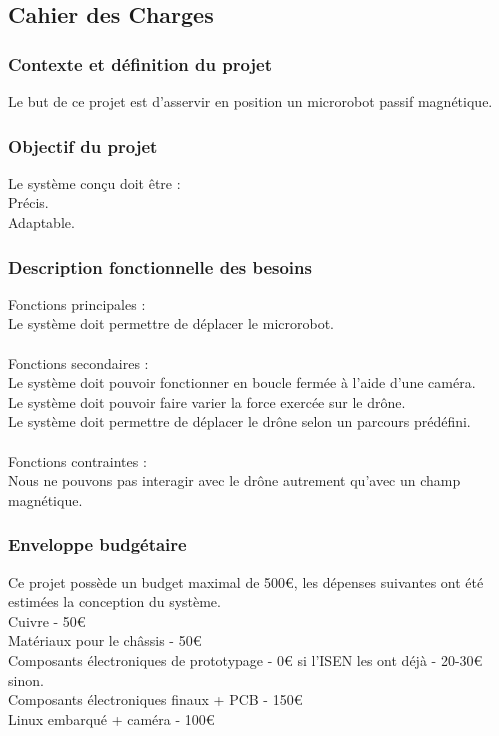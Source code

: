 \documentclass{article}
\begin{document}
    \subsection{Cahier des Charges}
        \subsubsection*{Contexte et définition du projet}
            \noindent Le but de ce projet est d'asservir en position un microrobot passif magnétique.

        \subsubsection*{Objectif du projet}
            \noindent Le système conçu doit être :
            \\
            \tabto{1cm}Précis.
            \\
            \tabto{1cm}Adaptable.

        \subsubsection*{Description fonctionnelle des besoins}
            \noindent Fonctions principales :
            \\
            \tabto{1cm}Le système doit permettre de déplacer le microrobot.
            \\\\
            Fonctions secondaires :
            \\
            \tabto{1cm}Le système doit pouvoir fonctionner en boucle fermée à l'aide d'une caméra.
            \\
            \tabto{1cm}Le système doit pouvoir faire varier la force exercée sur le drône.
            \\
            \tabto{1cm}Le système doit permettre de déplacer le drône selon un parcours prédéfini.
            \\\\
            Fonctions contraintes :
            \\
            \tabto{1cm}Nous ne pouvons pas interagir avec le drône autrement qu'avec un champ magnétique.

        \subsubsection*{Enveloppe budgétaire}
            \noindent Ce projet possède un budget maximal de 500€, les dépenses suivantes ont été estimées la conception du système.
            \\
            \tabto{1cm}Cuivre - 50€
            \\
            \tabto{1cm}Matériaux pour le châssis - 50€
            \\
            \tabto{1cm}Composants électroniques de prototypage - 0€ si l'ISEN les ont déjà - 20-30€ sinon.
            \\
            \tabto{1cm}Composants électroniques finaux + PCB - 150€
            \\
            \tabto{1cm}Linux embarqué + caméra - 100€
\end{document}
